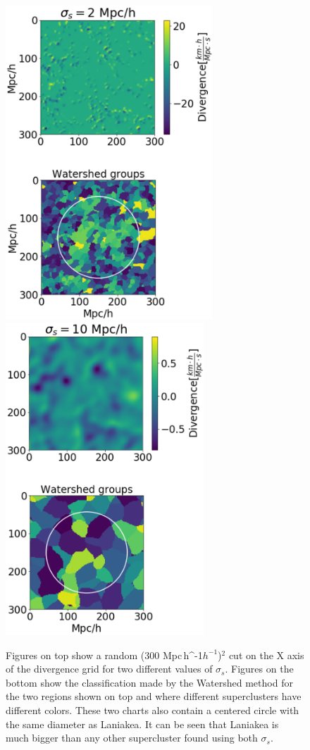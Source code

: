 \documentclass[usenatbib]{mnras}
\newcommand{\Mpch}{\,{\rm Mpc}\,\ifmmode h^{-1}\else $h^{-1}$\fi}
\begin{document}
\begin{figure}
    \centering
    \includegraphics[width=220pt]{smooth_watershed_01.pdf}
    \includegraphics[width=211pt]{smooth_watershed_05.pdf}
    \caption{Figures on top show a random (300\,\Mpch)$^2$ cut on the X axis of the divergence grid for two different values of $\sigma_s$. Figures on the bottom show the classification made by the Watershed method for the two regions shown on top and where different superclusters have different colors. These two charts also contain a centered circle with the same diameter as Laniakea. It can be seen that Laniakea is much bigger than any other supercluster found using both $\sigma_s$.}
    \label{fig:1Pert}
\end{figure}
\end{document}
